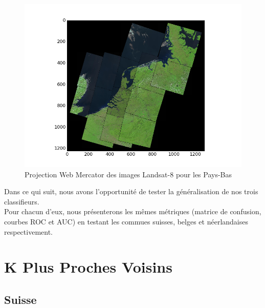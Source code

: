 \documentclass{book}
\begin{document}
 \begin{figure}[H]
 \begin{center}
 \includegraphics[scale=0.60]{../../data/Pays-Bas/covering-selection.png}
 \caption{Projection Web Mercator des images Landsat-8 pour les Pays-Bas}
\label{pays-bas_landsat}
\end{center}
\end{figure}

Dans ce qui suit, nous avons l'opportunité de tester la généralisation de nos trois classifieurs.\\
Pour chacun d'eux, nous présenterons les mêmes métriques (matrice de confusion, courbes ROC et AUC) en testant les commues suisses, belges et néerlandaises respectivement.

\section{K Plus Proches Voisins}

\subsection{Suisse}
\end{document}
